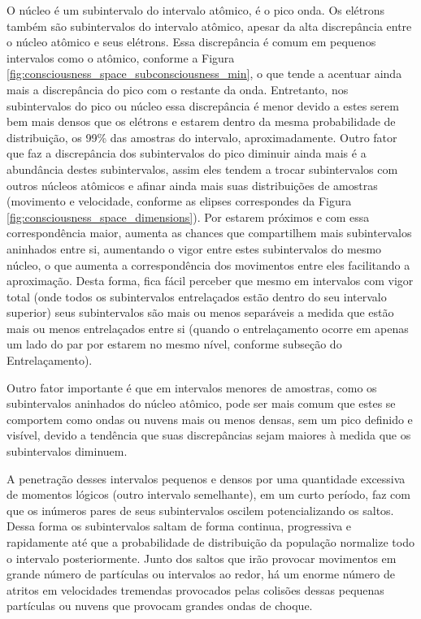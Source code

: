 O núcleo é um subintervalo do intervalo atômico, é o pico onda. Os elétrons também são subintervalos do intervalo atômico, apesar da alta discrepância entre o núcleo atômico e seus elétrons. Essa discrepância é comum em pequenos intervalos como o atômico, conforme a Figura \ref{fig:consciousness_space_subconsciousness_min}, o que tende a acentuar ainda mais a discrepância do pico com o restante da onda. Entretanto, nos subintervalos do pico ou núcleo essa discrepância é menor devido a estes serem bem mais densos que os elétrons e estarem dentro da mesma probabilidade de distribuição, os 99\% das amostras do intervalo, aproximadamente. Outro fator que faz a discrepância dos subintervalos do pico diminuir ainda mais é a abundância destes subintervalos, assim eles tendem a trocar subintervalos com outros núcleos atômicos e afinar ainda mais suas distribuições de amostras (movimento e velocidade, conforme as elipses correspondes da Figura \ref{fig:consciousness_space_dimensions}). Por estarem próximos e com essa correspondência maior, aumenta as chances que compartilhem mais subintervalos aninhados entre si, aumentando o vigor entre estes subintervalos do mesmo núcleo, o que aumenta a correspondência dos movimentos entre eles facilitando a aproximação. Desta forma, fica fácil perceber que mesmo em intervalos com vigor total (onde todos os subintervalos entrelaçados estão dentro do seu intervalo superior) seus subintervalos são mais ou menos separáveis a medida que estão mais ou menos entrelaçados entre si (quando o entrelaçamento ocorre em apenas um lado do par por estarem no mesmo nível, conforme subseção do Entrelaçamento).

Outro fator importante é que em intervalos menores de amostras, como os subintervalos aninhados do núcleo atômico, pode ser mais comum que estes se comportem como ondas ou nuvens mais ou menos densas, sem um pico definido e visível, devido a tendência que suas discrepâncias sejam maiores à medida que os subintervalos diminuem.

A penetração desses intervalos pequenos e densos por uma quantidade excessiva de momentos lógicos (outro intervalo semelhante), em um curto período, faz com que os inúmeros pares de seus subintervalos oscilem potencializando os saltos. Dessa forma os subintervalos saltam de forma continua, progressiva e rapidamente até que a probabilidade de distribuição da população normalize todo o intervalo posteriormente. Junto dos saltos que irão provocar movimentos em grande número de partículas ou intervalos ao redor, há um enorme número de atritos em velocidades tremendas provocados pelas colisões dessas pequenas partículas ou nuvens que provocam grandes ondas de choque.

